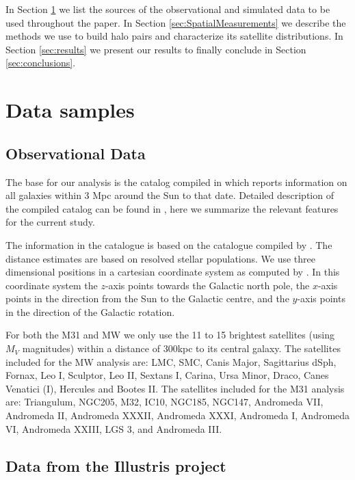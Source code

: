 \documentclass[a4paper,fleqn,usenatbib]{mnras}
\begin{document}
In Section \ref{sec:DataSamples} we list the sources of the observational and
simulated data to be used throughout the paper.
In Section \ref{sec:SpatialMeasurements} we describe the methods we use to build halo pairs and 
characterize its satellite distributions.
In Section \ref{sec:results} we present our results to finally
conclude in Section \ref{sec:conclusions}. 

\section{Data samples}\label{sec:DataSamples}

\subsection{Observational Data}
\label{sec:obs}

The base for our analysis is the catalog compiled in
\citep{2014yCat..74351928P} which reports information on all 
galaxies within 3 Mpc around the Sun to that date. 
Detailed description of the compiled catalog can be found in
\citep{2013MNRAS.435.1928P}, here we summarize the relevant features
for the current study.

The information in the catalogue is based on the catalogue compiled by
\cite{2012AJ....144....4M}.
The distance estimates are based on resolved stellar populations. 
We use three dimensional positions in a cartesian coordinate system
as computed by \cite{2013MNRAS.435.1928P}.
In this coordinate system the $z$-axis points towards the Galactic north pole, the
$x$-axis points in the direction from the Sun to the Galactic centre,
and the $y$-axis points in the direction of the Galactic rotation.


For both the M31 and MW we only use the 11 to 15 brightest satellites (using
$M_V$ magnitudes) within a distance of $300$kpc to its central galaxy.
The satellites included for the MW analysis are: 
LMC, SMC, Canis Major, Sagittarius dSph, Fornax, Leo I, Sculptor,
Leo II, Sextans I, Carina, Ursa Minor, Draco, Canes Venatici (I),
Hercules and Bootes II.
The satellites included for the M31 analysis are: Triangulum, NGC205,
M32, IC10, NGC185, NGC147, Andromeda VII, Andromeda II, Andromeda
XXXII, Andromeda XXXI, Andromeda I, Andromeda VI, Andromeda XXIII, LGS 3, 
 and Andromeda III.



\subsection{Data from the Illustris project}
\label{sec:illustris}
\end{document}
